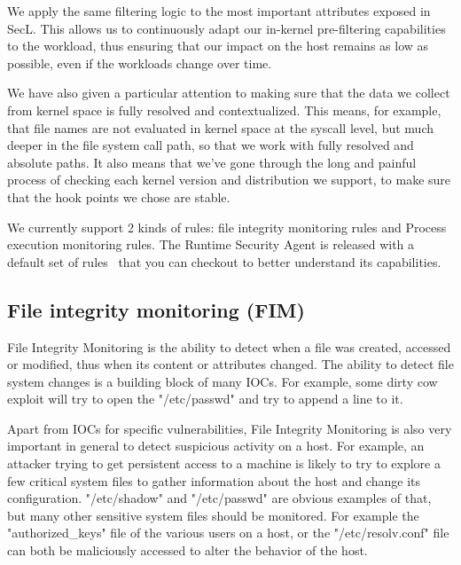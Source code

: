 We apply the same filtering logic to the most important attributes exposed in SecL.
This allows us to continuously adapt our in-kernel pre-filtering capabilities to the workload, thus ensuring that our impact on the host remains as low as possible, even if the workloads change over time.

We have also given a particular attention to making sure that the data we collect from kernel space is fully resolved and contextualized.
This means, for example, that file names are not evaluated in kernel space at the syscall level, but much deeper in the file system call path, so that we work with fully resolved and absolute paths.
It also means that we've gone through the long and painful process of checking each kernel version and distribution we support, to make sure that the hook points we chose are stable.

We currently support 2 kinds of rules: file integrity monitoring rules and Process execution monitoring rules.
The Runtime Security Agent is released with a default set of rules~\cite{RuntimeSecurityMonitoringWithEBPF:SecurityAgentPolicies} that you can checkout to better understand its capabilities.

\subsection{File integrity monitoring (FIM)}

File Integrity Monitoring is the ability to detect when a file was created, accessed or modified, thus when its content or attributes changed.
The ability to detect file system changes is a building block of many IOCs.
For example, some dirty cow exploit will try to open the "/etc/passwd" and try to append a line to it.

Apart from IOCs for specific vulnerabilities, File Integrity Monitoring is also very important in general to detect suspicious activity on a host.
For example, an attacker trying to get persistent access to a machine is likely to try to explore a few critical system files to gather information about the host and change its configuration.
"/etc/shadow" and "/etc/passwd" are obvious examples of that, but many other sensitive system files should be monitored.
For example the "authorized\_keys" file of the various users on a host, or the "/etc/resolv.conf" file can both be maliciously accessed to alter the behavior of the host.

